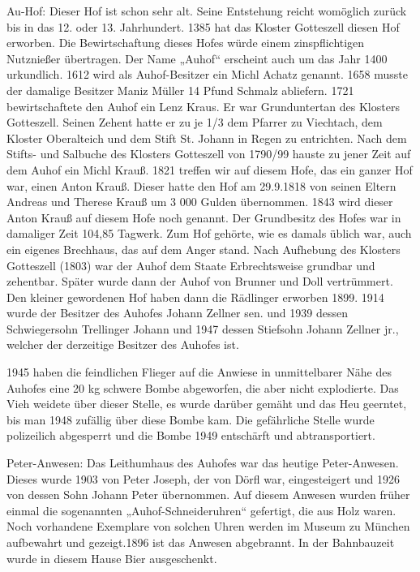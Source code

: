 \documentclass[12pt,a4pager]{book}
\begin{document}
Au-Hof: Dieser Hof ist schon sehr alt. Seine Entstehung reicht womöglich zurück
bis in das 12. oder 13. Jahrhundert. 1385 hat das Kloster Gotteszell diesen Hof
erworben. Die Bewirtschaftung dieses Hofes würde einem zinspflichtigen
Nutznießer übertragen. Der Name „Auhof“ erscheint auch um das Jahr 1400
urkundlich. 1612 wird als Auhof-Besitzer ein Michl Achatz genannt. 1658 musste
der damalige Besitzer Maniz Müller 14 Pfund Schmalz abliefern. 1721
bewirtschaftete den Auhof ein Lenz Kraus. Er war Grunduntertan des Klosters
Gotteszell. Seinen Zehent hatte er zu je 1/3 dem Pfarrer zu Viechtach, dem
Kloster Oberalteich und dem Stift St. Johann in Regen zu entrichten. Nach dem
Stifts- und Salbuche des Klosters Gotteszell von 1790/99 hauste zu jener Zeit
auf dem Auhof ein Michl Krauß. 1821 treffen wir auf diesem Hofe, das ein ganzer
Hof war, einen Anton Krauß. Dieser hatte den Hof am 29.9.1818 von seinen Eltern
Andreas und Therese Krauß um 3 000 Gulden übernommen. 1843 wird dieser Anton
Krauß auf diesem Hofe noch genannt. Der Grundbesitz des Hofes war in damaliger
Zeit 104,85 Tagwerk. Zum Hof gehörte, wie es damals üblich war, auch ein eigenes
Brechhaus, das auf dem Anger stand. Nach Aufhebung des Klosters Gotteszell
(1803) war der Auhof dem Staate Erbrechtsweise grundbar und zehentbar. Später
wurde dann der Auhof von Brunner und Doll vertrümmert. Den kleiner gewordenen
Hof haben dann die Rädlinger erworben 1899. 1914 wurde der Besitzer des Auhofes
Johann Zellner sen. und 1939 dessen Schwiegersohn Trellinger Johann und 1947
dessen Stiefsohn Johann Zellner jr., welcher der derzeitige Besitzer des Auhofes
ist.

1945 haben die feindlichen Flieger auf die Anwiese in unmittelbarer Nähe des
Auhofes eine 20 kg schwere Bombe abgeworfen, die aber nicht explodierte. Das
Vieh weidete über dieser Stelle, es wurde darüber gemäht und das Heu geerntet,
bis man 1948 zufällig über diese Bombe kam. Die gefährliche Stelle wurde
polizeilich abgesperrt und die Bombe 1949 entschärft und abtransportiert.

Peter-Anwesen: Das Leithumhaus des Auhofes war das heutige Peter-Anwesen. Dieses
wurde 1903 von Peter Joseph, der von Dörfl war, eingesteigert und 1926 von
dessen Sohn Johann Peter übernommen. Auf diesem Anwesen wurden früher einmal die
sogenannten „Auhof-Schneideruhren“ gefertigt, die aus Holz waren. Noch
vorhandene Exemplare von solchen Uhren werden im Museum zu München aufbewahrt
und gezeigt.1896 ist das Anwesen abgebrannt. In der Bahnbauzeit wurde in diesem
Hause Bier ausgeschenkt.
\end{document}

